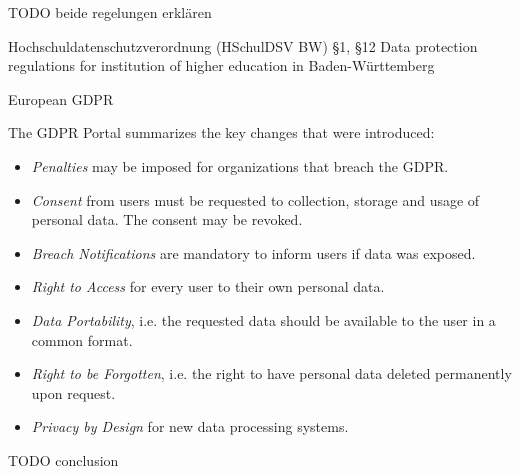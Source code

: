 TODO beide regelungen erklären



Hochschuldatenschutzverordnung (HSchulDSV BW) §1, §12 \autocite{bw2012hcchuldsv}
Data protection regulations for institution of higher education in Baden-Württemberg

European \ac{GDPR} \autocite{eu2016gdpr}

The \ac{GDPR} Portal \autocite{trunomi2018gdpr} summarizes the key changes that were introduced:
\begin{itemize}
    \item \emph{Penalties} may be imposed for organizations that breach the \ac{GDPR}.
    \item \emph{Consent} from users must be requested to collection, storage and usage of personal data. The consent may be revoked.
    \item \emph{Breach Notifications} are mandatory to inform users if data was exposed.
    \item \emph{Right to Access} for every user to their own personal data.
    \item \emph{Data Portability}, i.e. the requested data should be available to the user in a common format.
    \item \emph{Right to be Forgotten}, i.e. the right to have personal data deleted permanently upon request.
    \item \emph{Privacy by Design} for new data processing systems.
\end{itemize}

TODO conclusion

